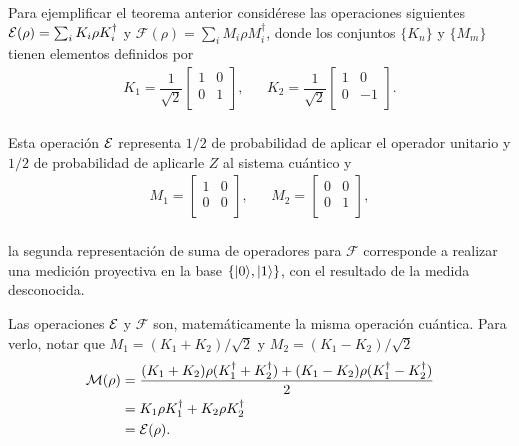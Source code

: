 Para ejemplificar el teorema anterior  considérese las operaciones siguientes $\mathcal{E}(\rho)=\sum_i K_i\rho K_i^\dagger$ y $\mathcal{F}(\rho)=\sum_i M_i\rho M_i^\dagger$, donde los conjuntos $\{K_n\}$ y $\{M_m\}$ tienen elementos definidos por 
\begin{equation}
    \begin{array}{ccc}
        K_1=\dfrac{1}{\sqrt{2}}\begin{bmatrix}
            1&0\\
            0&1\\
        \end{bmatrix},&&K_2=\dfrac{1}{\sqrt{2}}\begin{bmatrix}
            1&0\\
            0&-1\\
        \end{bmatrix}.\\
    \end{array}
\end{equation}

Esta operación $\mathcal{E}$ representa $1/2$ de probabilidad de aplicar el operador unitario y $1/2$ de probabilidad de aplicarle $Z$ al sistema cuántico y
\begin{equation}
    \begin{array}{ccc}
        M_1=\begin{bmatrix}
            1&0\\
            0&0\\
        \end{bmatrix},&&M_2=\begin{bmatrix}
            0&0\\
            0&1\\
        \end{bmatrix},\\
    \end{array}
\end{equation}

la segunda representación de suma de operadores para $\mathcal{F}$ corresponde a realizar una medición proyectiva en la base $\{|0\rangle , |1\rangle\}$, con el resultado de la medida desconocida. 



Las operaciones $\mathcal{E}$ y $\mathcal{F}$ son, matemáticamente la misma operación cuántica. Para verlo, notar que $M_1=(K_1+K_2)/\sqrt{2}$ y $M_2=(K_1-K_2)/\sqrt{2}$
\begin{equation}
    \begin{split}
        \mathcal{M}(\rho)&=\dfrac{(K_1+K_2)\rho(K_1^\dagger+K_2^\dagger)+(K_1-K_2)\rho(K_1^\dagger-K_2^\dagger)}{2}\\
        &=K_1\rho K_1^\dagger+K_2\rho K_2^\dagger\\
        &=\mathcal{E}(\rho).
    \end{split}
\end{equation}

